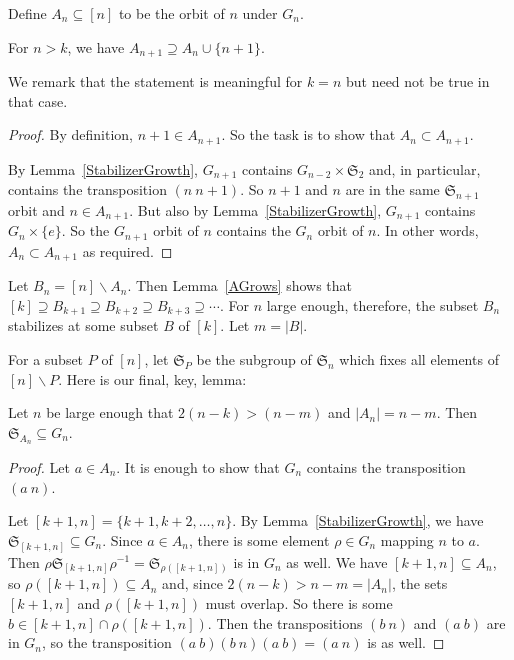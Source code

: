 \documentclass[ALCO,ThmDefs,Unicode,epreuves]{cedram}
\newcommand{\Sn}{\mathfrak{S}}
\begin{document}
Define $A_n \subseteq [n]$ to be the orbit of $n$ under $G_n$. 

\begin{lemma} \label{AGrows}
For $n > k$, we have $A_{n+1} \supseteq A_n \cup \{ n+1 \}$.
\end{lemma}

We remark that the statement is meaningful for $k=n$ but need not be true in that case.

\begin{proof}
By definition, $n+1 \in A_{n+1}$. So the task is to show that $A_n \subset A_{n+1}$.

By Lemma~\ref{StabilizerGrowth}, $G_{n+1}$ contains $G_{n-2} \times \Sn_2$ and, in particular, contains the transposition $(n \ n+1)$. So $n+1$ and $n$ are in the same $\Sn_{n+1}$ orbit and $n \in A_{n+1}$. But also by Lemma~\ref{StabilizerGrowth}, $G_{n+1}$ contains $G_n \times \{ e \}$. So the $G_{n+1}$ orbit of $n$ contains the $G_n$ orbit of $n$. In other words, $A_n \subset A_{n+1}$ as required.
\end{proof}

Let $B_n = [n] \backslash A_n$. Then Lemma~\ref{AGrows} shows that $[k] \supseteq B_{k+1} \supseteq B_{k+2} \supseteq B_{k+3} \supseteq \cdots$.
For $n$ large enough, therefore, the subset $B_n$ stabilizes at some subset $B$ of $[k]$. Let $m = |B|$. 

For a subset $P$ of $[n]$, let $\Sn_P$ be the subgroup of $\Sn_n$ which fixes all elements of $[n] \backslash P$.
Here is our final, key, lemma:


\begin{lemma} \label{KeyLemma}
Let $n$ be large enough that $2(n-k) > (n-m)$ and $|A_n| = n-m$. Then $\Sn_{A_n} \subseteq G_n$.
\end{lemma}

\begin{proof}
Let $a \in A_n$. It is enough to show that $G_n$ contains the transposition $(a\ n)$.

Let $[k+1, n] = \{ k+1, k+2, \ldots, n \}$. By Lemma~\ref{StabilizerGrowth}, we have $\Sn_{[k+1, n]} \subseteq G_n$.
Since $a \in A_n$, there is some element $\rho \in G_n$ mapping $n$ to $a$. Then $\rho \Sn_{[k+1, n ]} \rho^{-1} = \Sn_{\rho([k+1, n])}$ is in $G_n$ as well.
We have $[k+1, n] \subseteq A_n$, so $\rho([k+1, n]) \subseteq A_n$ and, since $2(n-k) > n-m = |A_n|$, the sets $[k+1, n]$ and $\rho([k+1, n])$ must overlap. So there is some $b \in [k+1, n] \cap \rho([k+1, n])$. Then the transpositions $(b \ n)$ and $(a \ b)$ are in $G_n$, so the transposition $(a\ b) (b \ n) (a\ b) = (a \ n)$ is as well.
\end{proof}
\end{document}
